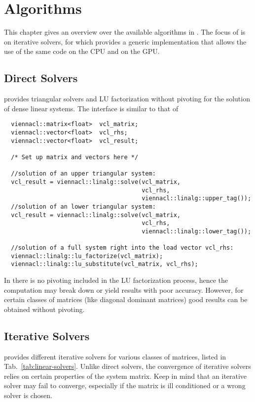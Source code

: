 \chapter{Algorithms}

This chapter gives an overview over the available algorithms in {\ViennaCL}. The focus of {\ViennaCL} is on iterative solvers, for which {\ViennaCL} provides a generic implementation that allows the use of the same code on the CPU and on the GPU.

\section{Direct Solvers} \label{sec:direct-solvers}
{\ViennaCLversion} provides triangular solvers and LU factorization without pivoting for the solution of dense linear systems. The interface is similar to that of {\ublas}

\begin{lstlisting}
  viennacl::matrix<float>  vcl_matrix;
  viennacl::vector<float>  vcl_rhs;
  viennacl::vector<float>  vcl_result;

  /* Set up matrix and vectors here */

  //solution of an upper triangular system:
  vcl_result = viennacl::linalg::solve(vcl_matrix,
                                       vcl_rhs,
                                       viennacl::linalg::upper_tag());
  //solution of an lower triangular system:
  vcl_result = viennacl::linalg::solve(vcl_matrix,
                                       vcl_rhs,
                                       viennacl::linalg::lower_tag());

  //solution of a full system right into the load vector vcl_rhs:
  viennacl::linalg::lu_factorize(vcl_matrix);
  viennacl::linalg::lu_substitute(vcl_matrix, vcl_rhs);    
\end{lstlisting}
In {\ViennaCLminorversion} there is no pivoting included in the LU factorization process, hence the computation may break down or yield results with poor accuracy. However, for certain classes of matrices (like diagonal dominant matrices) good results can be obtained without pivoting.

\section{Iterative Solvers} \label{sec:iterative-solvers}
{\ViennaCL} provides different iterative solvers for various classes of
matrices, listed in Tab.~\ref{tab:linear-solvers}. Unlike direct solvers, the
convergence of iterative solvers relies on certain properties of the system
matrix. Keep in mind that an iterative solver may fail to converge, especially
if the matrix is ill conditioned or a wrong solver is chosen. 


